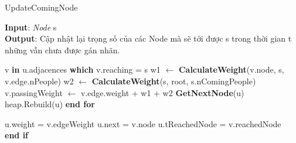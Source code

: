 \documentclass{article}
\begin{document}
    \begin{algorithm}
        \caption{UpdateComingNode}
        \textbf{Input}: \textit{Node} s \\ 
        \textbf{Output}: Cập nhật lại trọng số của các Node mà sẽ tới được s
        trong thời gian t những vẫn chưa được gán nhãn.
        \begin{algorithmic}
            \State v \textbf{in} u.adjacences \textbf{which} v.reaching = s
            \State w1 $\gets$ \textbf{CalculateWeight}(v.node, s, v.edge.nPeople)
            \State w2 $\gets$ \textbf{CalculateWeight}(s, root, s.nComingPeople)
            \State v.passingWeight $\gets$ v.edge.weight + w1 + w2
            \State \textbf{GetNextNode}(u)
            \State heap.Rebuild(u)
            \EndFor
            \textbf{end for}
            \EndProcedure

            \State u.weight = v.edgeWeight
            \State u.next = v.node
            \State u.tReachedNode = v.reachedNode \\
            \EndIf
            \textbf{end if}
            \EndFor
            \EndProcedure
        \end{algorithmic}
    \end{algorithm}
\end{document}

